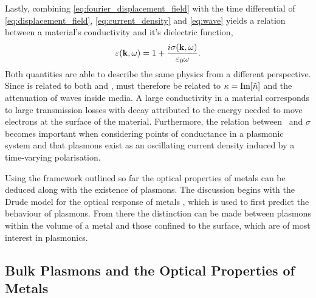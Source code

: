 \documentclass{article}
\begin{document}
Lastly, combining \eqref{eq:fourier_displacement_field} with the time differential of \eqref{eq:displacement_field}, \eqref{eq:current_density} and \eqref{eq:wave}
yields a relation between a material's conductivity and it's dielectric function,
\begin{equation}
	\varepsilon(\mathbf{k}, \omega) = 1 + \frac{i\sigma(\mathbf{k}, \omega)}{\varepsilon_0\omega}.
	\label{eq:dielectric_conductivity}
\end{equation}
Both quantities are able to describe the same physics from a different perspective.
Since \real{\eps} is related to both \imag{\sigma} and , \real{\sigma} must therefore be related to $\kappa=\mathrm{Im}\!\left[{\tilde{n}}\right]$ and the attenuation of waves inside media. A large conductivity in a material corresponds to large transmission losses with decay attributed to the energy needed to move electrons at the surface of the material. Furthermore, the relation between \dielectric\ and $\sigma$ becomes important when considering points of conductance in a plasmonic system and that plasmons exist as an oscillating current density induced by a time-varying polarisation.

Using the framework outlined so far the optical properties of metals can be deduced along with the existence of plasmons. The discussion begins with the Drude model for the optical response of metals \cite{drude1900}, which is used to first predict the behaviour of plasmons. From there the distinction can be made between plasmons within the volume of a metal and those confined to the surface, which are of most interest in plasmonics.

\subsection{Bulk Plasmons and the Optical Properties of Metals}
\end{document}
